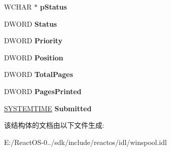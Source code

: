 \begin{DoxyCompactItemize}
W\+C\+H\+AR $\ast$ {\bfseries p\+Status}
\item 
\mbox{\label{struct___w_i_n_s_p_o_o_l___j_o_b___i_n_f_o__1_ade5ba25f4c97d0cd19a2020841d8f9a1}} 
D\+W\+O\+RD {\bfseries Status}
\item 
\mbox{\label{struct___w_i_n_s_p_o_o_l___j_o_b___i_n_f_o__1_a88bd15afb3db9ca58c478d5aefc73c58}} 
D\+W\+O\+RD {\bfseries Priority}
\item 
\mbox{\label{struct___w_i_n_s_p_o_o_l___j_o_b___i_n_f_o__1_a003c602b1032e4cb13b9490af25f72ed}} 
D\+W\+O\+RD {\bfseries Position}
\item 
\mbox{\label{struct___w_i_n_s_p_o_o_l___j_o_b___i_n_f_o__1_aa45892a625eaf1f06266d338997c8f14}} 
D\+W\+O\+RD {\bfseries Total\+Pages}
\item 
\mbox{\label{struct___w_i_n_s_p_o_o_l___j_o_b___i_n_f_o__1_a01099b1fb4401f5b3ab65f2e5c01d8af}} 
D\+W\+O\+RD {\bfseries Pages\+Printed}
\item 
\mbox{\label{struct___w_i_n_s_p_o_o_l___j_o_b___i_n_f_o__1_af6d52393e22d91c14d095edd09864ba9}} 
\hyperlink{struct___s_y_s_t_e_m_t_i_m_e}{S\+Y\+S\+T\+E\+M\+T\+I\+ME} {\bfseries Submitted}
\end{DoxyCompactItemize}


该结构体的文档由以下文件生成\+:\begin{DoxyCompactItemize}
\item 
E\+:/\+React\+O\+S-\/0../sdk/include/reactos/idl/winspool.\+idl\end{DoxyCompactItemize}
